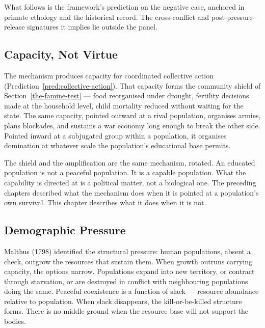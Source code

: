 \documentclass[12pt,letterpaper]{article}
\begin{document}
What follows is the framework's prediction on the negative case,
anchored in primate ethology and the historical record. The
cross-conflict and post-pressure-release signatures it implies lie
outside the panel.

\subsection{Capacity, Not Virtue}\label{capacity-not-virtue}

The mechanism produces capacity for coordinated collective action
(Prediction~\ref{pred:collective-action}). That capacity forms the
community shield of Section~\ref{the-famine-test} --- food reorganised
under drought, fertility decisions made at the household level, child
mortality reduced without waiting for the state. The same capacity,
pointed outward at a rival population, organises armies, plans
blockades, and sustains a war economy long enough to break the other
side. Pointed inward at a subjugated group within a population, it
organises domination at whatever scale the population's educational
base permits.

The shield and the amplification are the same mechanism, rotated. An
educated population is not a peaceful population. It is a capable
population. What the capability is directed at is a political matter,
not a biological one. The preceding chapters described what the
mechanism does when it is pointed at a population's own survival. This
chapter describes what it does when it is not.

\subsection{Demographic Pressure}\label{demographic-pressure}

Malthus (1798) identified the structural pressure: human populations,
absent a check, outgrow the resources that sustain them. When growth
outruns carrying capacity, the options narrow. Populations expand into
new territory, or contract through starvation, or are destroyed in
conflict with neighbouring populations doing the same. Peaceful
coexistence is a function of slack --- resource abundance relative to
population. When slack disappears, the kill-or-be-killed structure
forms. There is no middle ground when the resource base will not
support the bodies.
\end{document}
